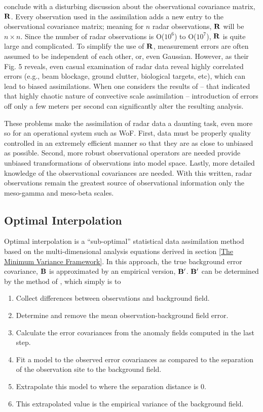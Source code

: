 \cite{fabry2011details} conclude with a disturbing discussion about the observational covariance matrix, $\mathbf{R}$. Every observation used in the assimilation adds a new entry to the observational covariance matrix; meaning for $n$ radar observations, $\mathbf{R}$ will be $n\times n$. Since the number of radar observations is O($10^6$) to O($10^7$), $\mathbf{R}$ is quite large and complicated. To simplify the use of $\mathbf{R}$, measurement errors are often assumed to be independent of each other, or, even Gaussian. However, as their Fig. 5 reveals, even casual examination of radar data reveal highly correlated errors (e.g., beam blockage, ground clutter, biological targets, etc), which can lead to biased assimilations. When one considers the results of \cite{hohenegger2007predictability} -- that indicated that highly chaotic nature of convective scale assimilation -- introduction of errors off only a few meters per second can significantly alter the resulting analysis.


These problems make the assimilation of radar data a daunting task, even more so for an operational system such as WoF. First, data must be properly quality controlled in an extremely efficient manner so that they are as close to unbiased as possible. Second, more robust observational operators are needed provide unbiased transformations of observations into model space. Lastly, more detailed knowledge of the observational covariances are needed. With this written, radar observations remain the greatest source of observational information only the meso-gamma and meso-beta scales.




\subsection{Optimal Interpolation}

Optimal interpolation is a ``sub-optimal'' statistical data assimilation method based on the multi-dimensional analysis equations derived in section \ref{The Minimum Variance Framework}. In this approach, the true background error covariance, $\mathbf{B}$ is approximated by an empirical version, $\mathbf{B'}$. $\mathbf{B'}$ can be determined by the method of \cite{hollingsworth1986si}, which simply is to


\begin{enumerate}
    \item Collect differences between observations and background field.
    \item Determine and remove the mean observation-background field error.
    \item Calculate the error covariances from the anomaly fields computed in the last step.
    \item Fit a model to the observed error covariances as compared to the separation of the observation site to the background field.
    \item Extrapolate this model to where the separation distance is 0.
    \item This extrapolated value is the empirical variance of the background field.
\end{enumerate}


